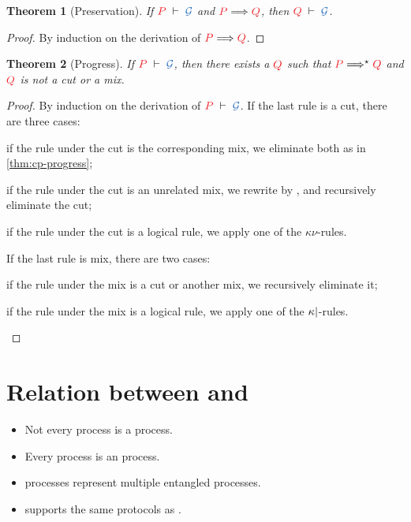 \documentclass[draft,submission,copyright,creativecommons]{eptcs}
\newtheorem{theorem}{Theorem}
\begin{document}
\begin{theorem}[Preservation]\label{thm:hcp-preservation}
  If $\seq[P]{\mathcal{G}}$ and $\reducesto{P}{Q}$, then $\seq[Q]{\mathcal G}$.
\end{theorem}
\begin{proof}
  By induction on the derivation of $\reducesto{P}{Q}$.
\end{proof}

\begin{theorem}[Progress]\label{thm:hcp-progress}
  If $\seq[P]{\mathcal{G}}$, then there exists a $\tm{Q}$ such that
  $\tm{P}\Longrightarrow^\star\tm{Q}$ and $\tm{Q}$ is not a cut or a mix.
\end{theorem}
\begin{proof}
  By induction on the derivation of $\seq[P]{\mathcal{G}}$.
  If the last rule is a cut, there are three cases:
  \begin{enumerate*}[label={\alph*)}]
  \item
    if the rule under the cut is the corresponding mix, we eliminate both as in
    \cref{thm:cp-progress};
  \item
    if the rule under the cut is an unrelated mix, we rewrite by
    \hccpEquivScopeExt{}, and recursively eliminate the cut;
  \item
    if the rule under the cut is a logical rule, we apply one of the
    $\kappa\nu$-rules.
  \end{enumerate*}
  If the last rule is mix, there are two cases:
  \begin{enumerate*}[label={\alph*)}]
  \item
    if the rule under the mix is a cut or another mix, we recursively eliminate it;
  \item
    if the rule under the mix is a logical rule, we apply one of the
    $\kappa{\ensuremath{\mid}}$-rules.
  \end{enumerate*}
\end{proof}

\section{Relation between \cp and \hcp}
\label{sec:cp2hcp}

\begin{itemize}
\item Not every \hcp process is a \cp process.
\item Every \cp process is an \hcp process.
\item \hcp processes represent multiple entangled \cp processes.
\item \hcp supports the same protocols as \cp.
\end{itemize}
\end{document}
